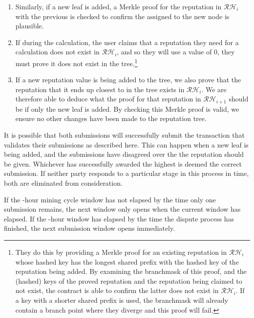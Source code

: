 \begin{itemize}
\begin{enumerate}
\item Similarly, if a new leaf is added, a Merkle proof for the reputation in $\mathcal{RH}_{i}$ with the previous  is checked to confirm the  assigned to the new node is plausible.
\item If during the calculation, the user claims that a reputation they need for a calculation does not exist in $\mathcal{RH}_{i}$, and so they will use a value of 0, they must prove it does not exist in the tree.\footnote{They do this by providing a Merkle proof for an existing reputation in $\mathcal{RH}_{i}$ whose hashed key has the longest shared prefix with the hashed key of the reputation being added. By examining the branchmask of this proof, and the (hashed) keys of the proved reputation and the reputation being claimed to not exist, the contract is able to confirm the latter does not exist in $\mathcal{RH}_{i}$. If a key with a shorter shared prefix is used, the branchmask will already contain a branch point where they diverge and this proof will fail.} %
\item If a new reputation value is being added to the tree, we also prove that the reputation that it ends up closest to in the tree exists in $\mathcal{RH}_{i}$. We are therefore able to deduce what the proof for that reputation in $\mathcal{RH}_{i+1}$ should be if only the new leaf is added. By checking this Merkle proof is valid, we ensure no other changes have been made to the reputation tree.
\end{enumerate}
\end{itemize}

It is possible that both submissions will successfully submit the transaction that validates their submissions as described here. This can happen when a new leaf is being added, and the submissions have disagreed over the  the reputation should be given. Whichever has successfully awarded the highest  is deemed the correct submission. If neither party responds to a particular stage in this process in time, both are eliminated from consideration.

If the \miningcycleduration-hour mining cycle window has not elapsed by the time only one submission remains, the next window only opens when the current window has elapsed. If the \miningcycleduration-hour window has elapsed by the time the dispute process has finished, the next submission window opens immediately.

